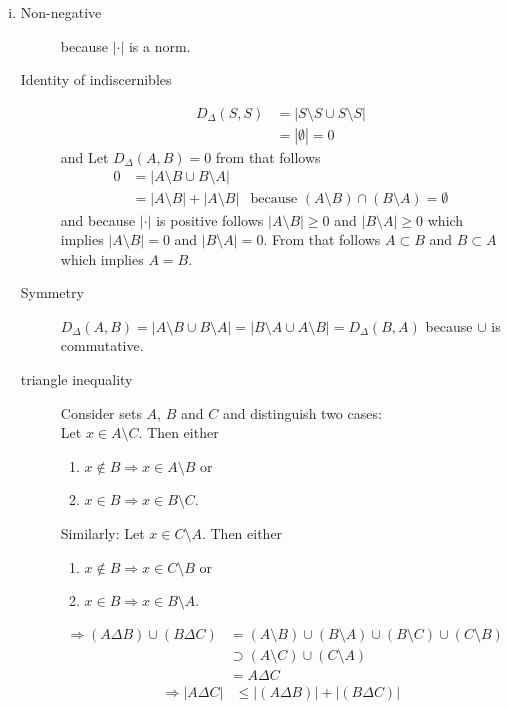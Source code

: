 \documentclass[10pt,a4paper,boxed]{hmcpset}
\begin{document}
\begin{solution}
\begin{enumerate}[(i)]
				\item 
					\begin{description}
						\item[Non-negative] because $|\cdot|$ is a norm.
						\item[Identity of indiscernibles] 
							\begin{align}
								D_\Delta(S,S) &= |S\setminus S \cup S\setminus S| \\
															&= | \emptyset	| = 0
							\end{align}
							and
							Let $D_\Delta(A,B) = 0$ from that follows 
							\begin{align}
								 0 &= |A\setminus B \cup B \setminus A| \\
								 &= | A \setminus B| + | A \setminus B| & \text{because } (A \setminus B) \cap (B \setminus A) = \emptyset \label{leererschnitt}
							\end{align}
							and because $| \cdot |$ is positive follows $|A \setminus B| \geq 0$ and $|B\setminus A| \geq 0$ which implies
							$|A \setminus B| = 0$ and $|B\setminus A| = 0$. From that follows $A \subset B$ and $B \subset A$ which implies $A=B$.
						\item[Symmetry] $D_\Delta(A,B) = |A \setminus B \cup B \setminus A| = | B \setminus A \cup A \setminus B| = D_\Delta(B,A)$ because $\cup$ is commutative.
						\item[triangle inequality]							
							Consider sets $A$, $B$ and $C$ and distinguish two cases:\\
							Let $x\in A \setminus C$. Then either
							\begin{enumerate}
								\item $x \notin B \Rightarrow x \in A \setminus B$ or
								\item $x \in B \Rightarrow x \in B \setminus C$.
							\end{enumerate}
							Similarly: Let $x\in C \setminus A$. Then either
							\begin{enumerate}
								\item $x \notin B \Rightarrow x \in C \setminus B$ or
								\item $x \in B \Rightarrow x \in B \setminus A$.
							\end{enumerate}
							\begin{align*}
								\Rightarrow (A \Delta B) \cup (B \Delta C) &= (A \setminus B) \cup (B \setminus A) \cup (B \setminus C ) \cup (C \setminus B)  \\
								&\supset (A \setminus C) \cup (C \setminus A)  \\
								&=  A \Delta C
							\end{align*}
							\begin{align*}
								\Rightarrow  \left\vert A \Delta C \right\vert &\leq \left\vert (A \Delta B) \right\vert + \left\vert (B \Delta C) \right\vert
							\end{align*}
							

\end{description}
\end{enumerate}
\end{solution}
\end{document}
